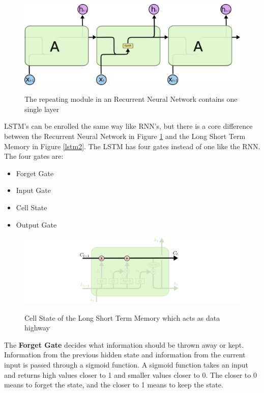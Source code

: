 \begin{figure}
	\begin{center}
		\includegraphics[width=4.5in]{photos/LSTM3-SimpleRNN}\\
		\caption{The repeating module in an Recurrent Neural Network contains one single layer \cite{olah}}\label{lstm}
	\end{center}
\end{figure}

LSTM's can be enrolled the same way like RNN's, but there is a core difference between the Recurrent Neural Network in Figure \ref{lstm} and the Long Short Term Memory in Figure \ref{lstm2}. The LSTM has four gates instead of one like the RNN. The four gates are:

\begin{itemize}		
	\item Forget Gate
	\item Input Gate
	\item Cell State
	\item Output Gate
\end{itemize}

\begin{figure}
	\begin{center}
		\includegraphics[width=4.5in]{photos/LSTM3-C-line}\\
		\caption{Cell State of the Long Short Term Memory which acts as data highway \cite{olah}}\label{lstm3}
	\end{center}
\end{figure}

The \textbf{Forget Gate} decides what information should be thrown away or kept. Information from the previous hidden state and information from the current input is passed through a sigmoid function. A sigmoid function takes an input and returns high values closer to 1 and smaller values closer to 0. The closer to 0 means to forget the state, and the closer to 1 means to keep the state.

